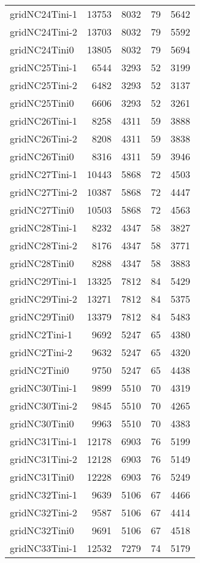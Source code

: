 \begin{longtable}{lrrrr}
gridNC24Tini-1 & 13753 & 8032 & 79 & 5642 \\
gridNC24Tini-2 & 13703 & 8032 & 79 & 5592 \\
gridNC24Tini0 & 13805 & 8032 & 79 & 5694 \\
gridNC25Tini-1 & 6544 & 3293 & 52 & 3199 \\
gridNC25Tini-2 & 6482 & 3293 & 52 & 3137 \\
gridNC25Tini0 & 6606 & 3293 & 52 & 3261 \\
gridNC26Tini-1 & 8258 & 4311 & 59 & 3888 \\
gridNC26Tini-2 & 8208 & 4311 & 59 & 3838 \\
gridNC26Tini0 & 8316 & 4311 & 59 & 3946 \\
gridNC27Tini-1 & 10443 & 5868 & 72 & 4503 \\
gridNC27Tini-2 & 10387 & 5868 & 72 & 4447 \\
gridNC27Tini0 & 10503 & 5868 & 72 & 4563 \\
gridNC28Tini-1 & 8232 & 4347 & 58 & 3827 \\
gridNC28Tini-2 & 8176 & 4347 & 58 & 3771 \\
gridNC28Tini0 & 8288 & 4347 & 58 & 3883 \\
gridNC29Tini-1 & 13325 & 7812 & 84 & 5429 \\
gridNC29Tini-2 & 13271 & 7812 & 84 & 5375 \\
gridNC29Tini0 & 13379 & 7812 & 84 & 5483 \\
gridNC2Tini-1 & 9692 & 5247 & 65 & 4380 \\
gridNC2Tini-2 & 9632 & 5247 & 65 & 4320 \\
gridNC2Tini0 & 9750 & 5247 & 65 & 4438 \\
gridNC30Tini-1 & 9899 & 5510 & 70 & 4319 \\
gridNC30Tini-2 & 9845 & 5510 & 70 & 4265 \\
gridNC30Tini0 & 9963 & 5510 & 70 & 4383 \\
gridNC31Tini-1 & 12178 & 6903 & 76 & 5199 \\
gridNC31Tini-2 & 12128 & 6903 & 76 & 5149 \\
gridNC31Tini0 & 12228 & 6903 & 76 & 5249 \\
gridNC32Tini-1 & 9639 & 5106 & 67 & 4466 \\
gridNC32Tini-2 & 9587 & 5106 & 67 & 4414 \\
gridNC32Tini0 & 9691 & 5106 & 67 & 4518 \\
gridNC33Tini-1 & 12532 & 7279 & 74 & 5179 \\

\end{longtable}

